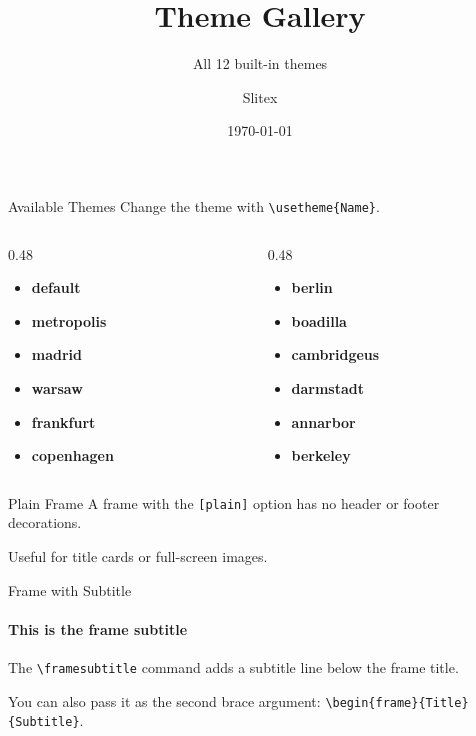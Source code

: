 \documentclass[aspectratio=169]{beamer}
\title{Theme Gallery}
\subtitle{All 12 built-in themes}
\author{Slitex}
\date{\today}
\begin{document}
\begin{frame}
  \titlepage
\end{frame}

\begin{frame}{Available Themes}
  Change the theme with \texttt{\textbackslash usetheme\{Name\}}.

  \bigskip

  \begin{columns}
    \begin{column}{0.48\textwidth}
      \begin{itemize}
        \item \textbf{default}
        \item \textbf{metropolis}
        \item \textbf{madrid}
        \item \textbf{warsaw}
        \item \textbf{frankfurt}
        \item \textbf{copenhagen}
      \end{itemize}
    \end{column}
    \begin{column}{0.48\textwidth}
      \begin{itemize}
        \item \textbf{berlin}
        \item \textbf{boadilla}
        \item \textbf{cambridgeus}
        \item \textbf{darmstadt}
        \item \textbf{annarbor}
        \item \textbf{berkeley}
      \end{itemize}
    \end{column}
  \end{columns}
\end{frame}

\begin{frame}[plain]{Plain Frame}
  A frame with the \texttt{[plain]} option has no header or footer decorations.

  Useful for title cards or full-screen images.
\end{frame}

\begin{frame}{Frame with Subtitle}
  \framesubtitle{This is the frame subtitle}

  The \texttt{\textbackslash framesubtitle} command adds a subtitle line below the frame title.

  You can also pass it as the second brace argument: \texttt{\textbackslash begin\{frame\}\{Title\}\{Subtitle\}}.
\end{frame}
\end{document}
